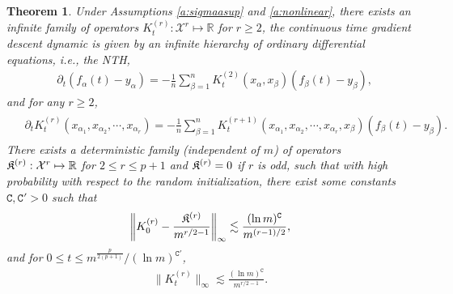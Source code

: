 \documentclass{article}
\numberwithin{equation}{section}
\newcommand\cX{{\mathcal X}}
\newcommand{\fC}{{\mathtt C}}
\newcommand{\fK}{{\frak K}}
\newcommand{\bR}{{\mathbb R}}
\newcommand{\al}{\alpha}
\DeclareMathOperator{\OO}{O}
\renewcommand{\leq}{\leqslant}
\renewcommand{\geq}{\geqslant}
\newcommand{\del}{\partial}
\newcommand{\1}{\mathds{1}}
\theoremstyle{plain} %
\newtheorem{theorem}{Theorem}[section]
\begin{document}
\begin{theorem}\label{t:main1}
Under Assumptions \ref{a:sigmaasup} and \ref{a:nonlinear}, there exists an infinite family of operators $K_t^{(r)}: \cX^r\mapsto \bR$ for $r\geq 2$, the continuous time gradient descent dynamic is given by an infinite hierarchy of ordinary differential equations, i.e., the NTH, 
\begin{align}\label{e:dynamic}
&\del_t(f_\al(t)-y_{\al})=-\frac{1}{n} \sum_{\beta=1}^n K_t^{(2)}(x_\al, x_\beta)(f_\beta(t)-y_\beta),
\end{align} 
and for any $r\geq 2$,
\begin{align}\begin{split}\label{e:dynamicr}
&\del_tK_t^{(r)}(x_{\al_1},x_{\al_2},\cdots, x_{\al_r})=-\frac{1}{n} \sum_{\beta=1}^n K^{(r+1)}_t(x_{\al_1}, x_{\al_2}, \cdots, x_{\alpha_r}, x_\beta)(f_\beta(t)-y_\beta).
\end{split}\end{align}
There exists a deterministic family (independent of $m$) of operators $\fK^{(r)}: \cX^r\mapsto \bR$ for $2\leq r\leq p+1$  and $\fK^{(r)}=0$ if $r$ is odd, such that with high probability with respect to the random initialization, there exist some constants $\fC, \fC'>0$ such that 
\begin{align}\label{e:tprior1}
\left\|K^{(r)}_0-\frac{\fK^{(r)}}{m^{r/2-1}}\right\|_{\infty}\lesssim \frac{(\ln m)^\fC}{m^{(r-1)/2}},
\end{align}
and for $0\leq t\leq m^{\frac{p}{2(p+1)}}/(\ln m)^{\fC'}$,  
\begin{align}\label{e:tprior2}
\|K^{(r)}_t\|_{\infty}\lesssim \frac{(\ln m)^\fC}{m^{r/2-1}}.
\end{align}
\end{theorem}
\end{document}
